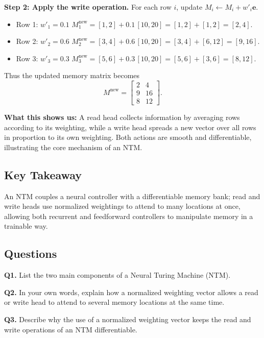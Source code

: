 \documentclass[12pt, a4paper]{article}
\begin{document}
\textbf{Step 2: Apply the write operation.}  
For each row \(i\), update \(M_i \leftarrow M_i + w'_i \mathbf{e}\).

\begin{itemize}
\item Row 1: \(w'_1 = 0.1\)  
\(M_1^{\text{new}} = [1,2] + 0.1\,[10,20] = [1,2] + [1,2] = [2,4]\).

\item Row 2: \(w'_2 = 0.6\)  
\(M_2^{\text{new}} = [3,4] + 0.6\,[10,20] = [3,4] + [6,12] = [9,16]\).

\item Row 3: \(w'_3 = 0.3\)  
\(M_3^{\text{new}} = [5,6] + 0.3\,[10,20] = [5,6] + [3,6] = [8,12]\).
\end{itemize}

Thus the updated memory matrix becomes
\[
M^{\text{new}} = \begin{bmatrix}
2 & 4 \\[2pt]
9 & 16 \\[2pt]
8 & 12
\end{bmatrix}.
\]

\textbf{What this shows us:}  
A read head collects information by averaging rows according to its weighting, while a write head spreads a new vector over all rows in proportion to its own weighting.  Both actions are smooth and differentiable, illustrating the core mechanism of an NTM.

\subsection{Key Takeaway}
An NTM couples a neural controller with a differentiable memory bank; read and write heads use normalized weightings to attend to many locations at once, allowing both recurrent and feedforward controllers to manipulate memory in a trainable way.

\newpage
\subsection*{Questions}

\textbf{Q1.} List the two main components of a Neural Turing Machine (NTM).

\textbf{Q2.} In your own words, explain how a normalized weighting vector allows a read or write head to attend to several memory locations at the same time.

\textbf{Q3.} Describe why the use of a normalized weighting vector keeps the read and write operations of an NTM differentiable.
\end{document}
